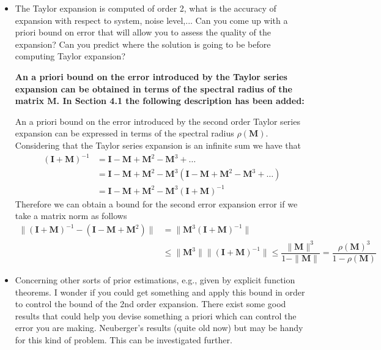 \documentclass[11pt]{article}
\begin{document}
\begin{itemize}
	\item The Taylor expansion is computed of order 2, what is the accuracy of expansion with respect to system, noise level,... Can you come up with a priori bound on error that will allow you to assess the quality of the expansion? Can you predict where the solution is going to be before computing Taylor expansion?
	
	{\bfseries An a priori bound on the error introduced by the Taylor series expansion can be obtained in terms of the spectral radius of the matrix $\mathbf{M}$. In Section 4.1 the following description has been added: }
	
    \color{blue} An a priori bound on the error introduced by the second order Taylor series expansion can be expressed in terms of the spectral radius $\rho(\mathbf{M})$.
    Considering that the Taylor series expansion is an infinite sum we have that
    \begin{equation} \tag{4.4} \begin{aligned} (\mathbf{I} + \mathbf{M})^{-1} &= \mathbf{I} - \mathbf{M} + \mathbf{M}^2 - \mathbf{M}^3 + \ldots \\
    &=  \mathbf{I} - \mathbf{M} + \mathbf{M}^2 - \mathbf{M}^3 \left( \mathbf{I} - \mathbf{M} + \mathbf{M}^2 - \mathbf{M}^3 + \ldots \right) \\
    &=  \mathbf{I} - \mathbf{M} + \mathbf{M}^2 - \mathbf{M}^3  (\mathbf{I} + \mathbf{M})^{-1} \end{aligned} \end{equation} 
    Therefore we can obtain a bound for the second error expansion error if we take a matrix norm as follows
    \begin{equation} \tag{4.5} \begin{aligned} \| (\mathbf{I} + \mathbf{M})^{-1} - ( \mathbf{I} - \mathbf{M} + \mathbf{M}^2 ) \| &=  \| \mathbf{M}^3  (\mathbf{I} + \mathbf{M})^{-1} \| \\
    & \leq \| \mathbf{M}^3 \| \| (\mathbf{I} + \mathbf{M})^{-1} \| \leq \dfrac{\| \mathbf{M} \|^3}{ 1 -  \| \mathbf{M} \|} = \dfrac{\rho(\mathbf{M})^3}{1 - \rho(\mathbf{M})}  \end{aligned} \end{equation} 
	\color{black}
	
	\item  Concerning other sorts of prior estimations, e.g., given by explicit function theorems. I wonder if you could get something and apply this bound in order to control the bound of the 2nd order expansion. There exist some good results that could help you devise something a priori which can control the error you are making. Neuberger's results (quite old now) but may be handy for this kind of problem. This can be investigated further.
	

\end{itemize}
\end{document}
